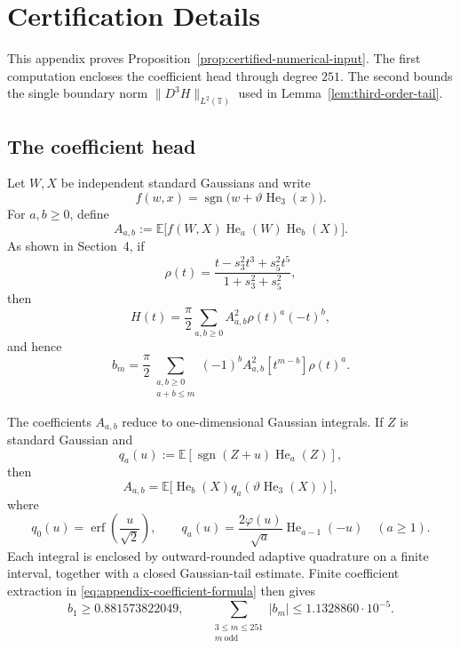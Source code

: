 \section{Certification Details}
\label{app:certification-details}

This appendix proves Proposition~\ref{prop:certified-numerical-input}.  The
first computation encloses the coefficient head through degree $251$.  The
second bounds the single boundary norm
$\|D^3H\|_{L^2(\mathbb T)}$ used in
Lemma~\ref{lem:third-order-tail}.

\subsection{The coefficient head}
\label{app:certification-coefficient-head}

Let $W,X$ be independent standard Gaussians and write
\[
  f(w,x)=\operatorname{sgn}\bigl(w+\vartheta\operatorname{He}_3(x)\bigr).
\]
For $a,b\ge0$, define
\[
  A_{a,b}
  :=\mathbb E\bigl[f(W,X)\operatorname{He}_a(W)
  \operatorname{He}_b(X)\bigr].
\]
As shown in Section~4, if
\[
  \rho(t)=\frac{t-s_3^2t^3+s_5^2t^5}{1+s_3^2+s_5^2},
\]
then
\begin{equation}
  H(t)=\frac{\pi}{2}\sum_{a,b\ge0}A_{a,b}^2\rho(t)^a(-t)^b,
  \label{eq:appendix-correlation-expansion}
\end{equation}
and hence
\begin{equation}
  b_m=\frac{\pi}{2}
  \sum_{\substack{a,b\ge0\\a+b\le m}}
  (-1)^bA_{a,b}^2[t^{m-b}]\rho(t)^a.
  \label{eq:appendix-coefficient-formula}
\end{equation}

The coefficients $A_{a,b}$ reduce to one-dimensional Gaussian integrals.  If
$Z$ is standard Gaussian and
\[
  q_a(u):=\mathbb E[\operatorname{sgn}(Z+u)\operatorname{He}_a(Z)],
\]
then
\[
  A_{a,b}
  =\mathbb E\bigl[\operatorname{He}_b(X)
  q_a(\vartheta\operatorname{He}_3(X))\bigr],
\]
where
\[
  q_0(u)=\operatorname{erf}\!\left(\frac{u}{\sqrt2}\right),
  \qquad
  q_a(u)=\frac{2\varphi(u)}{\sqrt a}
  \operatorname{He}_{a-1}(-u)
  \quad(a\ge1).
\]
Each integral is enclosed by outward-rounded adaptive quadrature on a finite
interval, together with a closed Gaussian-tail estimate.  Finite coefficient
extraction in \eqref{eq:appendix-coefficient-formula} then gives
\begin{equation}
  b_1\ge0.881573822049,
  \qquad
  \sum_{\substack{3\le m\le251\\m\ \mathrm{odd}}}|b_m|
  \le1.1328860\cdot10^{-5}.
  \label{eq:appendix-head-output}
\end{equation}

